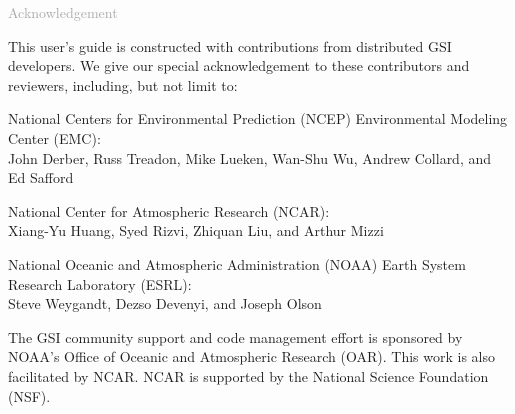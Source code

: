 \begin{titlepage}
\vspace*{0.5cm}
\noindent

\begin{flushleft}
\textcolor{darkgray}{\LARGE Acknowledgement}
\vspace*{1cm}\par

This user's guide is constructed with contributions from distributed GSI developers. We give our special acknowledgement to these contributors and reviewers, including, but not limit to:

National Centers for Environmental Prediction (NCEP) Environmental Modeling Center (EMC): \\
John Derber, Russ Treadon, Mike Lueken, Wan-Shu Wu, Andrew Collard, and Ed Safford 

National Center for Atmospheric Research (NCAR): \\
Xiang-Yu Huang, Syed Rizvi, Zhiquan Liu, and Arthur Mizzi  

National Oceanic and Atmospheric Administration (NOAA) Earth System Research Laboratory (ESRL): \\
Steve Weygandt, Dezso Devenyi, and Joseph Olson

The GSI community support and code management effort is sponsored by NOAA's Office of Oceanic and Atmospheric Research (OAR). This work is also facilitated by NCAR. NCAR is supported by the National Science Foundation (NSF).

\end{flushleft}
\end{titlepage}
\pagebreak{}




